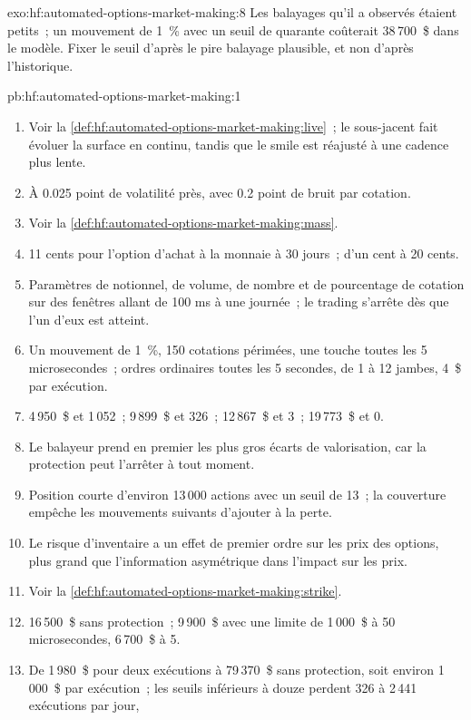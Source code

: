 \begin{solution}{exo:hf:automated-options-market-making:8}
Les balayages qu'il a observés étaient petits~; un mouvement de 1~\% avec un seuil de quarante coûterait 38\,700~\$ dans le modèle. Fixer le seuil d'après le pire
balayage plausible, et non d'après l'historique.
\end{solution}

\begin{solution}{pb:hf:automated-options-market-making:1}
\begin{enumerate}
\item Voir la \cref{def:hf:automated-options-market-making:live}~; le sous-jacent fait évoluer la surface en continu, tandis que le smile est réajusté à une cadence plus lente.
\item À 0.025 point de volatilité près, avec 0.2 point de bruit par cotation.
\item Voir la \cref{def:hf:automated-options-market-making:mass}.
\item 11 cents pour l'option d'achat à la monnaie à 30 jours~; d'un cent à 20 cents.
\item Paramètres de notionnel, de volume, de nombre et de pourcentage de cotation sur des fenêtres allant de 100 ms à une journée~; le trading s'arrête dès que l'un d'eux est atteint.
\item Un mouvement de 1~\%, 150 cotations périmées, une touche toutes les 5 microsecondes~; ordres ordinaires toutes les 5 secondes, de 1 à 12 jambes, 4~\$ par exécution.
\item 4\,950~\$ et 1\,052~; 9\,899~\$ et 326~; 12\,867~\$ et 3~; 19\,773~\$ et 0.
\item Le balayeur prend en premier les plus gros écarts de valorisation, car la protection peut l'arrêter à tout moment.
\item Position courte d'environ 13\,000 actions avec un seuil de 13~; la couverture empêche les mouvements suivants d'ajouter à la perte.
\item Le risque d'inventaire a un effet de premier ordre sur les prix des options, plus grand que l'information asymétrique dans l'impact sur les prix.
\item Voir la \cref{def:hf:automated-options-market-making:strike}.
\item 16\,500~\$ sans protection~; 9\,900~\$ avec une limite de 1\,000~\$ à 50 microsecondes, 6\,700~\$ à 5.
\item De 1\,980~\$ pour deux exécutions à 79\,370~\$ sans protection, soit environ 1\,000~\$ par exécution~; les seuils inférieurs à douze perdent 326 à 2\,441 exécutions par jour,

\end{enumerate}
\end{solution}
